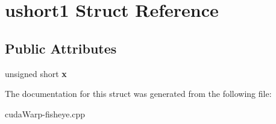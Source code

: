 \hypertarget{structushort1}{}\section{ushort1 Struct Reference}
\label{structushort1}
\subsection*{Public Attributes}
\begin{DoxyCompactItemize}
\item 
unsigned short {\bfseries x}\hypertarget{structushort1_a69d5c4b7fb043ed7329cfb9503fa02e4}{}\label{structushort1_a69d5c4b7fb043ed7329cfb9503fa02e4}

\end{DoxyCompactItemize}


The documentation for this struct was generated from the following file\+:\begin{DoxyCompactItemize}
\item 
cuda\+Warp-\/fisheye.\+cpp\end{DoxyCompactItemize}
